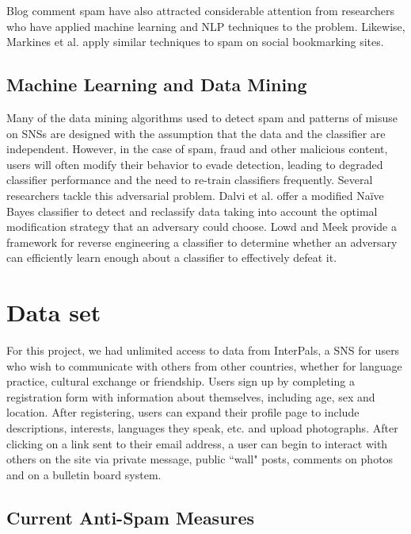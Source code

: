 \documentclass[preprint]{acm_proc_article-sp}
\begin{document}
Blog comment spam have also attracted considerable attention from researchers who have applied machine learning \cite{kolari, nag} and NLP \cite{mishne} techniques to the problem. Likewise, Markines et al. \cite{markines} apply similar techniques to spam on social bookmarking sites.

\subsection{Machine Learning and Data Mining}

Many of the data mining algorithms used to detect spam and patterns of misuse on SNSs are designed with the assumption that the data and the classifier are independent. However, in the case of spam, fraud and other malicious content, users will often modify their behavior to evade detection, leading to degraded classifier performance and the need to re-train classifiers frequently. Several researchers tackle this adversarial problem. Dalvi et al. \cite{dalvi} offer a modified Na\"ive Bayes classifier to detect and reclassify data taking into account the optimal modification strategy that an adversary could choose. Lowd and Meek \cite{lowd} provide a framework for reverse engineering a classifier to determine whether an adversary can efficiently learn enough about a classifier to effectively defeat it.


\section{Data set}

For this project, we had unlimited access to data from InterPals, a SNS for users who wish to communicate with others from other countries, whether for language practice, cultural exchange or friendship. Users sign up by completing a registration form with information about themselves, including age, sex and location. After registering, users can expand their profile page to include descriptions, interests, languages they speak, etc. and upload photographs. After clicking on a link sent to their email address, a user can begin to interact with others on the site via private message, public ``wall" posts, comments on photos and on a bulletin board system.

\subsection{Current Anti-Spam Measures}
\end{document}
